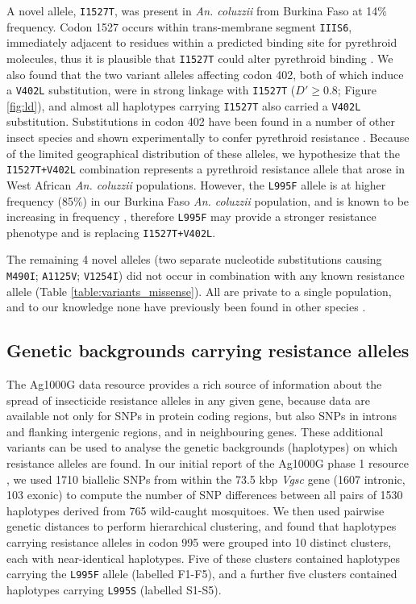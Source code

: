 \documentclass[a4paper,11pt,abstracton,hidelinks]{scrartcl}
\begin{document}
%
A novel allele, \texttt{I1527T}, was present in \textit{An. coluzzii} from Burkina Faso at 14\% frequency.
%
Codon 1527 occurs within trans-membrane segment \texttt{IIIS6}, immediately adjacent to residues within a predicted binding site for pyrethroid molecules, thus it is plausible that \texttt{I1527T} could alter pyrethroid binding \cite{Du2013,Dong2014}.
%
We also found that the two variant alleles affecting codon 402, both of which induce a \texttt{V402L} substitution, were in strong linkage with \texttt{I1527T} ($D' \geq 0.8$; Figure \ref{fig:ld}), and almost all haplotypes carrying \texttt{I1527T} also carried a \texttt{V402L} substitution.
%
Substitutions in codon 402 have been found in a number of other insect species and shown experimentally to confer pyrethroid resistance \cite{Dong2014}.
%
Because of the limited geographical distribution of these alleles, we hypothesize that the \texttt{I1527T+V402L} combination represents a pyrethroid resistance allele that arose in West African \textit{An. coluzzii} populations.
%
However, the \texttt{L995F} allele is at higher frequency (85\%) in our Burkina Faso \textit{An. coluzzii} population, and is known to be increasing in frequency \cite{Toe2014}, therefore \texttt{L995F} may provide a stronger resistance phenotype and is replacing \texttt{I1527T+V402L}.


%
The remaining 4 novel alleles (two separate nucleotide substitutions causing \texttt{M490I}; \texttt{A1125V}; \texttt{V1254I}) did not occur in combination with any known resistance allele (Table \ref{table:variants_missense}).
%
All are private to a single population, and to our knowledge none have previously been found in other species \cite{Rinkevich2013, Dong2014}.


\subsection*{Genetic backgrounds carrying resistance alleles}

%
The Ag1000G data resource provides a rich source of information about the spread of insecticide resistance alleles in any given gene, because data are available not only for SNPs in protein coding regions, but also SNPs in introns and flanking intergenic regions, and in neighbouring genes.
%
These additional variants can be used to analyse the genetic backgrounds (haplotypes) on which resistance alleles are found.
%
In our initial report of the Ag1000G phase 1 resource \cite{Ag1000gConsortium2017}, we used 1710 biallelic SNPs from within the 73.5 kbp \textit{Vgsc} gene (1607 intronic, 103 exonic) to compute the number of SNP differences between all pairs of 1530 haplotypes derived from 765 wild-caught mosquitoes.
%
We then used pairwise genetic distances to perform hierarchical clustering, and found that haplotypes carrying resistance alleles in codon 995 were grouped into 10 distinct clusters, each with near-identical haplotypes.
%
Five of these clusters contained haplotypes carrying the \texttt{L995F} allele (labelled F1-F5), and a further five clusters contained haplotypes carrying \texttt{L995S} (labelled S1-S5).
\end{document}
